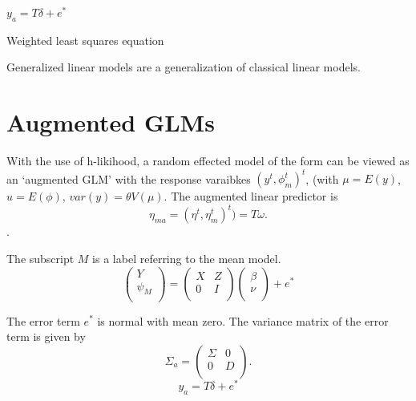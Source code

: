 \documentclass[12pt, a4paper]{article}
\begin{document}
$y_{a} = T \delta + e^{*}$


Weighted least squares equation








Generalized linear models are a generalization of classical linear  models.

\section{Augmented GLMs} %

With the use of h-likihood, a random effected model of the form can be viewed as an `augmented GLM' with the response varaibkes $(y^t, \phi^t_m)^t$, (with $\mu = E(y)$,$ u = E(\phi)$, $var(y) = \theta V (\mu)$.
The augmented linear predictor is \[\eta_{ma}  = (\eta^t, \eta^t_m)^t) = T\omega. \].



The subscript $M$ is a label referring to the mean model.
\begin{equation}
\left(%
\begin{array}{c}
Y \\
\psi_{M} \\
\end{array}%
\right) = \left(
\begin{array}{cc}
X & Z \\
0 & I \\
\end{array}\right) \left(%
\begin{array}{c}
\beta \\
\nu \\
\end{array}%
\right)+ e^{*}
\end{equation}




The error term $e^{*}$ is normal with mean zero. The variance matrix of the error term is given by
\begin{equation}
\Sigma_{a} = \left(%
\begin{array}{cc}
\Sigma & 0 \\
0 & D \\
\end{array}%
\right).
\end{equation}
\begin{equation}
y_{a} = T \delta + e^{*}
\end{equation}
\end{document}
